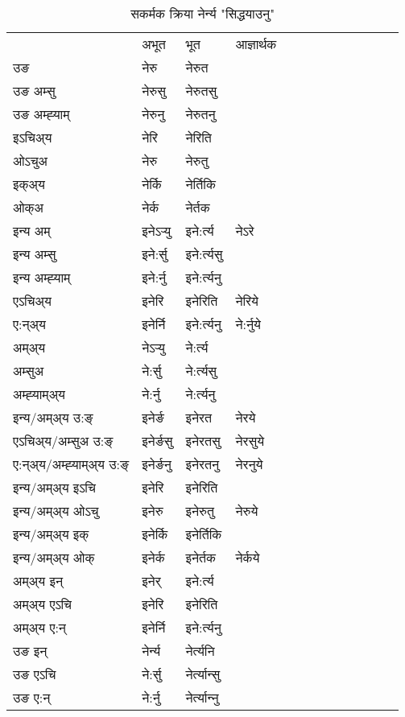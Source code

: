 \begin{table}[H]
\centering
\caption{\label{er.vt} सकर्मक क्रिया  नेर्न्य  "सिद्धयाउनु"  }
\begin{tabular}{l|l|l|l|l|l|l|l|l|l|l|l|l}  \toprule
&अभूत & भूत & आज्ञार्थक \\ 
उङ &नेरु &नेरुत \\ 
उङ अम्सु &नेरुसु &नेरुतसु \\ 
उङ अम्ह्‍याम् &नेरुनु &नेरुतनु \\ 
इऽचिअ्य &नेरि &नेरिति   \\ 
ओऽचुअ &नेरु &नेरुतु   \\ 
इक्अ्य &नेर्कि &नेर्तिकि   \\ 
ओक्अ &नेर्क &नेर्तक   \\ 
इन्य अम् & इनेऽर्‍यु  & इने:र्त्य &नेऽरे  \\ 
इन्य अम्सु & इने:र्सु  & इने:र्त्यसु   \\ 
इन्य अम्ह्‍याम् & इने:र्नु  & इने:र्त्यनु   \\ 
एऽचिअ्य & इनेरि & इनेरिति &नेरिये    \\ 
ए:न्अ्य & इनेर्नि  & इने:र्त्यनु &ने:र्नुये  \\ 
अम्अ्य & नेऽर्‍यु  & ने:र्त्य  \\ 
अम्सुअ & ने:र्सु & ने:र्त्यसु  \\ 
अम्ह्‍याम्अ्य & ने:र्नु  & ने:र्त्यनु \\ 
\midrule
इन्य/अम्अ्य उ:ङ्‌&इनेर्ङ & इनेरत &नेरये \\ 
एऽचिअ्य/अम्सुअ उ:ङ्‌ &इनेर्ङसु & इनेरतसु &नेरसुये \\ 
ए:न्अ्य/अम्ह्‍याम्अ्य उ:ङ्‌ &इनेर्ङनु & इनेरतनु &नेरनुये \\ 
इन्य/अम्अ्य इऽचि & इनेरि & इनेरिति    \\ 
इन्य/अम्अ्य ओऽचु & इनेरु & इनेरुतु  &नेरुये  \\ 
इन्य/अम्अ्य इक् & इनेर्कि & इनेर्तिकि   \\ 
इन्य/अम्अ्य ओक् & इनेर्क & इनेर्तक  &नेर्कये  \\ 
अम्अ्य इन् & इनेर् & इने:र्त्य   \\ 
अम्अ्य एऽचि & इनेरि & इनेरिति    \\ 
अम्अ्य ए:न् & इनेर्नि  & इने:र्त्यनु  \\ 
\midrule
उङ इन् & नेर्न्य  & नेर्त्यनि  \\ 
उङ एऽचि & ने:र्सु  & नेर्त्यान्सु   \\ 
उङ ए:न्& ने:र्नु  & नेर्त्यान्‍नु   \\ 
\bottomrule
\end{tabular}
\end{table}


